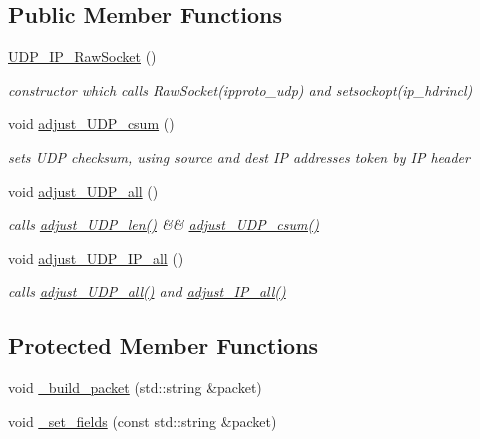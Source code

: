 \subsection*{Public Member Functions}
\begin{CompactItemize}
\item 
\hyperlink{classsocketpp_1_1UDP__IP__RawSocket_90e90d941b64d234c231ca543fe8745a}{UDP\_\-IP\_\-RawSocket} ()
\begin{CompactList}\small\item\em constructor which calls RawSocket(ipproto\_\-udp) and setsockopt(ip\_\-hdrincl) \item\end{CompactList}\item 
void \hyperlink{classsocketpp_1_1UDP__IP__RawSocket_6c2f6c375cec90f64fd093af37369d6a}{adjust\_\-UDP\_\-csum} ()
\begin{CompactList}\small\item\em sets UDP checksum, using source and dest IP addresses token by IP header \item\end{CompactList}\item 
void \hyperlink{classsocketpp_1_1UDP__IP__RawSocket_94bec31d8c856ccdafa083c74b8b7e58}{adjust\_\-UDP\_\-all} ()
\begin{CompactList}\small\item\em calls \hyperlink{classsocketpp_1_1UDP__RawSocket_1caa413cfe4f72d8c0aeccdcb10469b5}{adjust\_\-UDP\_\-len()} \&\& \hyperlink{classsocketpp_1_1UDP__IP__RawSocket_6c2f6c375cec90f64fd093af37369d6a}{adjust\_\-UDP\_\-csum()} \item\end{CompactList}\item 
void \hyperlink{classsocketpp_1_1UDP__IP__RawSocket_1a0f6360760f94f5c1569adde67d6d1b}{adjust\_\-UDP\_\-IP\_\-all} ()
\begin{CompactList}\small\item\em calls \hyperlink{classsocketpp_1_1UDP__IP__RawSocket_94bec31d8c856ccdafa083c74b8b7e58}{adjust\_\-UDP\_\-all()} and \hyperlink{classsocketpp_1_1IP__RawSocket_45e60510233daaa2f279d3a4706fdce5}{adjust\_\-IP\_\-all()} \item\end{CompactList}\end{CompactItemize}
\subsection*{Protected Member Functions}
\begin{CompactItemize}
\item 
void \hyperlink{classsocketpp_1_1UDP__IP__RawSocket_16035f1b701b898f0e4de44a9ac8bbb3}{\_\-build\_\-packet} (std::string \&packet)
\item 
void \hyperlink{classsocketpp_1_1UDP__IP__RawSocket_40fde867fa138b495f660864023a3eb1}{\_\-set\_\-fields} (const std::string \&packet)
\end{CompactItemize}


